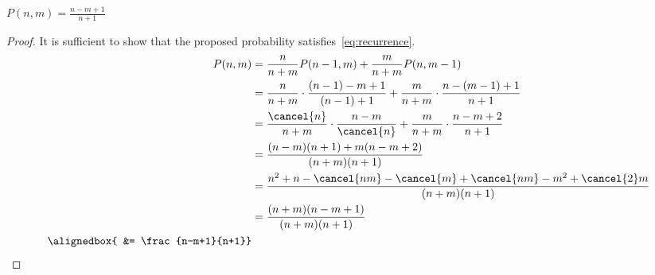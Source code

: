 \documentclass[
  coursecode={MTHE 455},
  assignmentname={Assignment \assignmentnumber},
  studentnumber=20053722,
  name={Bryan Hoang}
]{
  ltxanswer%
}
\begin{document}
\begin{questions}
\begin{solution}
      \newpage

      \begin{claim}
        \(P(n,m) = \frac{n-m+1}{n+1}\)
      \end{claim}
      \begin{proof}
        It is sufficient to show that the proposed probability satisfies~\eqref{eq:recurrence}.
        \begin{align*}
          P(n,m)       &= \frac{n}{n+m} P(n-1,m) + \frac{m}{n+m} P(n,m-1)                                             \\
                       &= \frac{n}{n+m} \cdot \frac{(n-1)-m+1}{(n-1)+1} + \frac{m}{n+m} \cdot \frac{n-(m-1)+1}{n+1}   \\
                       &= \frac{\cancel{n}}{n+m} \cdot \frac{n-m}{\cancel{n}} + \frac{m}{n+m} \cdot \frac{n-m+2}{n+1} \\
                       &= \frac{(n-m)(n+1) + m(n-m+2)}{(n+m)(n+1)}                                                    \\
                       &= \frac{n^{2} + n - \cancel{nm} - \cancel{m} + \cancel{nm} - m^{2} + \cancel{2}m}{(n+m)(n+1)} \\
                       &= \frac{(n+m)(n-m+1)}{(n+m)(n+1)}                                                             \\
          \alignedbox{ &= \frac{n-m+1}{n+1}}
        \end{align*}
      \end{proof}
    \end{solution}
  \end{questions}
\end{document}

